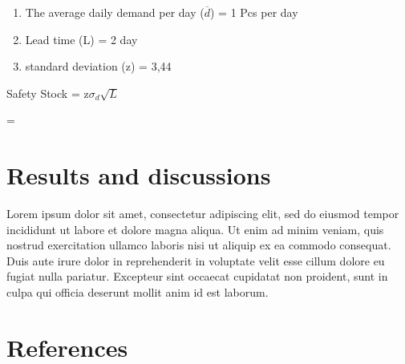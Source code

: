 \documentclass[12pt,a4paper,final]{iopart}
\begin{document}
\begin{enumerate}[label=(\alph*)]
	\item The average daily demand per day ($\overline{d}$) = 1 Pcs per day
	\item Lead time (L) = 2 day
	\item standard deviation (z) = 3,44
\end{enumerate}

Safety Stock = z$\sigma_d\sqrt{L}$

= 


\section{Results and discussions}

Lorem ipsum dolor sit amet, consectetur adipiscing elit, sed do eiusmod tempor incididunt ut labore et dolore magna aliqua. Ut enim ad minim veniam, quis nostrud exercitation ullamco laboris nisi ut aliquip ex ea commodo consequat. Duis aute irure dolor in reprehenderit in voluptate velit esse cillum dolore eu fugiat nulla pariatur. Excepteur sint occaecat cupidatat non proident, sunt in culpa qui officia deserunt mollit anim id est laborum.


\section*{References}




\end{document}

